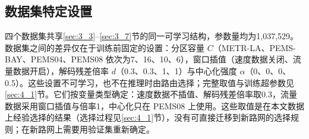 \subsection{数据集特定设置}\label{sec:3_8}

四个数据集共享\ref{sec:3_3}–\ref{sec:3_7}节的同一可学习结构，参数量均为1,037,529。数据集之间的差异仅在于训练前固定的设置：分区容量 $C$（METR-LA、PEMS-BAY、PEMS04、PEMS08 依次为7、16、10、6），窗口插值（速度数据关闭、流量数据开启），解码残差倍率 $d$（0.3、0.3、1、1）与中心化强度 $\alpha$（0、0、0、0.5）。这些设置不可学习，也不在推理时由路由选择；完整取值与训练超参数见\ref{sec:4_1}节。它们按变量类型确定：速度数据不插值、解码残差倍率取0.3，流量数据采用窗口插值与倍率1，中心化只在 PEMS08 上使用。这些取值是在本文数据上经验选择的结果（选择过程见\ref{sec:4_1}节），没有可直接迁移到新路网的选择规则；在新路网上需要用验证集重新确定。
